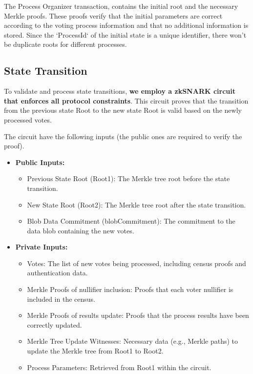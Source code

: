 The Process Organizer transaction, contains the initial root and the necessary Merkle proofs. These proofs verify that the initial parameters are correct according to the voting process information and that no additional information is stored. Since the `ProcessId` of the initial state is a unique identifier, there won't be duplicate roots for different processes.

\subsection{State Transition}

To validate and process state transitions, \textbf{we employ a zkSNARK circuit that enforces all protocol constraints}. This circuit proves that the transition from the previous state Root to the new state Root is valid based on the newly processed votes.

\begin{figure}[H]
	\centering
\end{figure}

The circuit have the following inputs (the public ones are required to verify the proof).

\begin{itemize}
	\item \textbf{Public Inputs:}
			\begin{itemize}
				\item Previous State Root (Root1): The Merkle tree root before the state transition.
				\item New State Root (Root2): The Merkle tree root after the state transition.
				\item Blob Data Commitment (blobCommitment): The commitment to the data blob containing the new votes.
			\end{itemize}
	\item \textbf{Private Inputs:}	
			\begin{itemize}
				\item Votes: The list of new votes being processed, including census proofs and authentication data.
				\item Merkle Proofs of nullifier inclusion: Proofs that each voter nullifier is included in the census.
				\item Merkle Proofs of results update: Proofs that the process results have been correctly updated.
				\item Merkle Tree Update Witnesses: Necessary data (e.g., Merkle paths) to update the Merkle tree from Root1 to Root2.
				\item Process Parameters: Retrieved from Root1 within the circuit.
			\end{itemize}
\end{itemize}

